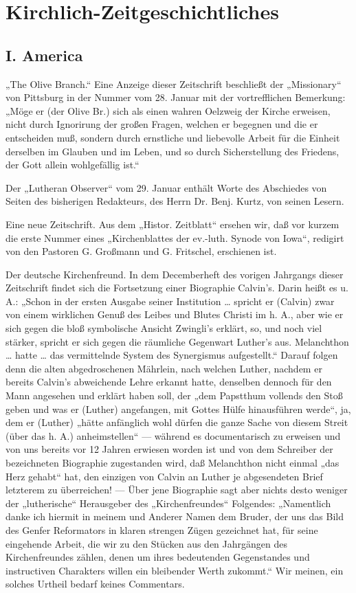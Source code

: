 \chapter{Kirchlich-Zeitgeschichtliches}

\section{I. America}

„The Olive Branch.“ Eine Anzeige dieser Zeitschrift beschließt der „Missionary“ von Pittsburg in der Nummer vom 28. Januar mit der vortrefflichen Bemerkung: „Möge er (der Olive Br.) sich als einen wahren Oelzweig der Kirche erweisen, nicht durch Ignorirung der großen Fragen, welchen er begegnen und die er entscheiden muß, sondern durch ernstliche und liebevolle Arbeit für die Einheit derselben im Glauben und im Leben, und so durch Sicherstellung des Friedens, der Gott allein wohlgefällig ist.“

Der „Lutheran Observer“ vom 29. Januar enthält Worte des Abschiedes von Seiten des bisherigen Redakteurs, des Herrn Dr. Benj. Kurtz, von seinen Lesern.

Eine neue Zeitschrift. Aus dem „Histor. Zeitblatt“ ersehen wir, daß vor kurzem die erste Nummer eines „Kirchenblattes der ev.-luth. Synode von Iowa“, redigirt von den Pastoren G. Großmann und G. Fritschel, erschienen ist.

Der deutsche Kirchenfreund. In dem Decemberheft des vorigen Jahrgangs dieser Zeitschrift findet sich die Fortsetzung einer Biographie Calvin’s. Darin heißt es u.\,A.: „Schon in der ersten Ausgabe seiner Institution … spricht er (Calvin) zwar von einem wirklichen Genuß des Leibes und Blutes Christi im h. A., aber wie er sich gegen die bloß symbolische Ansicht Zwingli’s erklärt, so, und noch viel stärker, spricht er sich gegen die räumliche Gegenwart Luther’s aus. Melanchthon … hatte … das vermittelnde System des Synergismus aufgestellt.“ Darauf folgen denn die alten abgedroschenen Mährlein, nach welchen Luther, nachdem er bereits Calvin’s abweichende Lehre erkannt hatte, denselben dennoch für den Mann angesehen und erklärt haben soll, der „dem Papstthum vollends den Stoß geben und was er (Luther) angefangen, mit Gottes Hülfe hinausführen werde“, ja, dem er (Luther) „hätte anfänglich wohl dürfen die ganze Sache von diesem Streit (über das h. A.) anheimstellen“ — während es documentarisch zu erweisen und von uns bereits vor 12 Jahren erwiesen worden ist und von dem Schreiber der bezeichneten Biographie zugestanden wird, daß Melanchthon nicht einmal „das Herz gehabt“ hat, den einzigen von Calvin an Luther je abgesendeten Brief letzterem zu überreichen! — Über jene Biographie sagt aber nichts desto weniger der „lutherische“ Herausgeber des „Kirchenfreundes“ Folgendes: „Namentlich danke ich hiermit in meinem und Anderer Namen dem Bruder, der uns das Bild des Genfer Reformators in klaren strengen Zügen gezeichnet hat, für seine eingehende Arbeit, die wir zu den Stücken aus den Jahrgängen des Kirchenfreundes zählen, denen um ihres bedeutenden Gegenstandes und instructiven Charakters willen ein bleibender Werth zukommt.“ Wir meinen, ein solches Urtheil bedarf keines Commentars.

